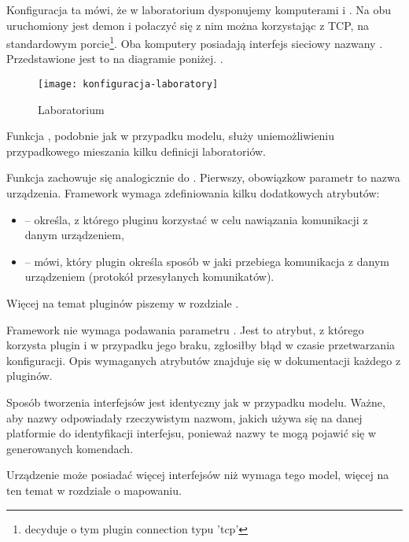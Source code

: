 \documentclass[00-praca-magisterska.tex]{subfiles}
\begin{document}
Konfiguracja ta mówi, że w laboratorium  dysponujemy komputerami
 i . Na obu uruchomiony jest demon  i
połaczyć się z nim można korzystając z TCP, na standardowym
porcie\footnote{decyduje o tym plugin connection typu 'tcp'}. Oba komputery
posiadają interfejs sieciowy nazwany . Przedstawione jest to na
diagramie poniżej. .

\begin{figure}[htb]
\begin{center}
\leavevmode
\texttt{[image: konfiguracja-laboratory]}
\end{center}
\caption{Laboratorium}
\label{fig:konfiguracja-laboratory}
\end{figure}

Funkcja , podobnie jak w przypadku modelu, służy
uniemożliwieniu przypadkowego mieszania kilku definicji laboratoriów.

Funkcja  zachowuje się analogicznie do .
Pierwszy, obowiązkow parametr to nazwa urządzenia. Framework wymaga
zdefiniowania kilku dodatkowych atrybutów:
\begin{itemize}
\item {} -- określa, z którego pluginu korzystać w celu
nawiązania komunikacji z danym urządzeniem,
\item {} -- mówi, który plugin określa sposób w jaki przebiega
komunikacja z danym urządzeniem (protokół przesyłanych komunikatów).
\end{itemize}

Więcej na temat pluginów piszemy w rozdziale .

Framework nie wymaga podawania parametru . Jest to atrybut, z którego
korzysta plugin  i w przypadku jego braku, zgłosiłby błąd w czasie
przetwarzania konfiguracji. Opis wymaganych atrybutów znajduje się w
dokumentacji każdego z pluginów.

Sposób tworzenia interfejsów jest identyczny jak w przypadku modelu. Ważne,
aby nazwy odpowiadały rzeczywistym nazwom, jakich używa się na danej
platformie do identyfikacji interfejsu, ponieważ nazwy te mogą pojawić się w
generowanych komendach.

Urządzenie może posiadać więcej interfejsów niż wymaga tego model, więcej na
ten temat w rozdziale o mapowaniu. 
\end{document}
